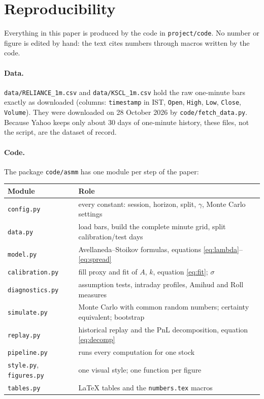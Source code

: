 \section{Reproducibility}
\label{app:code}

Everything in this paper is produced by the code in \texttt{project/code}. No number or figure is
edited by hand: the text cites numbers through macros written by the code.

\paragraph{Data.} \texttt{data/RELIANCE\_1m.csv} and \texttt{data/KSCL\_1m.csv} hold the raw
one-minute bars exactly as downloaded (columns: \texttt{timestamp} in IST, \texttt{Open},
\texttt{High}, \texttt{Low}, \texttt{Close}, \texttt{Volume}). They were downloaded on
28 October 2026 by \texttt{code/fetch\_data.py}. Because Yahoo keeps only about 30 days of
one-minute history, these files, not the script, are the dataset of record.

\paragraph{Code.} The package \texttt{code/asmm} has one module per step of the paper:
\begin{center}
\small
\begin{tabular}{ll}
\toprule
Module & Role \\
\midrule
\texttt{config.py} & every constant: session, horizon, split, $\gamma$, Monte Carlo settings \\
\texttt{data.py} & load bars, build the complete minute grid, split calibration/test days \\
\texttt{model.py} & Avellaneda--Stoikov formulas, equations \eqref{eq:lambda}--\eqref{eq:spread} \\
\texttt{calibration.py} & fill proxy and fit of $A$, $k$, equation \eqref{eq:fit}; $\sigma$ \\
\texttt{diagnostics.py} & assumption tests, intraday profiles, Amihud and Roll measures \\
\texttt{simulate.py} & Monte Carlo with common random numbers; certainty equivalent; bootstrap \\
\texttt{replay.py} & historical replay and the PnL decomposition, equation \eqref{eq:decomp} \\
\texttt{pipeline.py} & runs every computation for one stock \\
\texttt{style.py}, \texttt{figures.py} & one visual style; one function per figure \\
\texttt{tables.py} & LaTeX tables and the \texttt{numbers.tex} macros \\
\bottomrule
\end{tabular}
\end{center}

